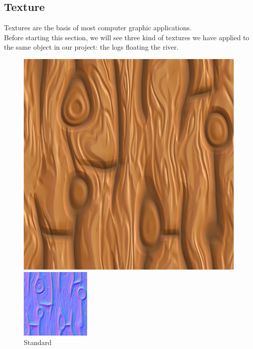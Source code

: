 \documentclass[a4paper, 11pt]{article}
\begin{document}
\subsection{Texture}
Textures are the basis of most computer graphic applications.\\
Before starting this section, we will see three kind of textures we have applied to the same object in our project: the logs floating the river.\\
\begin{figure}[!h]
  \includegraphics[width=\linewidth]{sidelog.jpg}
  \caption{Standard}\label{fig:tex_img}
\endminipage\hfill
{}
  \includegraphics[width=\linewidth]{sidelognormal.jpg}

\end{figure}
\end{document}
